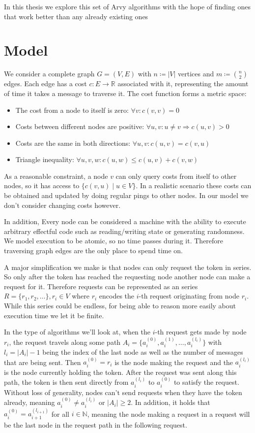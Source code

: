\documentclass[a4paper, oneside]{discothesis}
\begin{document}
In this thesis we explore this set of Arvy algorithms with the hope of finding ones that work better than any already existing ones

\section{Model}
\label{model}

We consider a complete graph $G=(V,E)$ with $n\coloneqq|V|$ vertices and $m\coloneqq\binom{n}{2}$ edges. Each edge has a cost $c : E \rightarrow \mathbb{R}$ associated with it, representing the amount of time it takes a message to traverse it. The cost function forms a metric space:
\begin{itemize}
\item The cost from a node to itself is zero: $\forall v:c(v, v)=0$
\item Costs between different nodes are positive: $\forall u,v : u\neq v\Rightarrow c(u,v)>0$
\item Costs are the same in both directions: $\forall u,v : c(u,v)=c(v,u)$
\item Triangle inequality: $\forall u,v,w : c(u,w)\leq c(u,v)+c(v,w)$
\end{itemize}

As a reasonable constraint, a node $v$ can only query costs from itself to other nodes, so it has access to $\{c(v, u)\;|\;u\in V\}$. In a realistic scenario these costs can be obtained and updated by doing regular pings to other nodes. In our model we don't consider changing costs however.

In addition, Every node can be considered a machine with the ability to execute arbitrary effectful code such as reading/writing state or generating randomness. We model execution to be atomic, so no time passes during it. Therefore traversing graph edges are the only place to spend time on.

A major simplification we make is that nodes can only request the token in series. So only after the token has reached the requesting node another node can make a request for it. Therefore requests can be represented as an series $R=\{r_1,r_2,\dots\},r_i\in V$ where $r_i$ encodes the $i$-th request originating from node $r_i$. While this series could be endless, for being able to reason more easily about execution time we let it be finite.

In the type of algorithms we'll look at, when the $i$-th request gets made by node $r_i$, the request travels along some path $A_i=\{a_i^{(0)},a_i^{(1)},\dots,a_i^{(l_i)}\}$ with $l_i=|A_i|-1$ being the index of the last node as well as the number of messages that are being sent. Then $a_i^{(0)}=r_i$ is the node making the request and the $a_i^{(l_i)}$ is the node currently holding the token. After the request was sent along this path, the token is then sent directly from $a_i^{(l_i)}$ to $a_i^{(0)}$ to satisfy the request. Without loss of generality, nodes can't send requests when they have the token already, meaning $a_i^{(0)}\neq a_i^{(l_i)}$ or $|A_i|\geq 2$. In addition, it holds that $a_i^{(0)}=a_{i+1}^{(l_{i+1})}$ for all $i\in\mathbb{N}$, meaning the node making a request in a request will be the last node in the request path in the following request.
\end{document}
